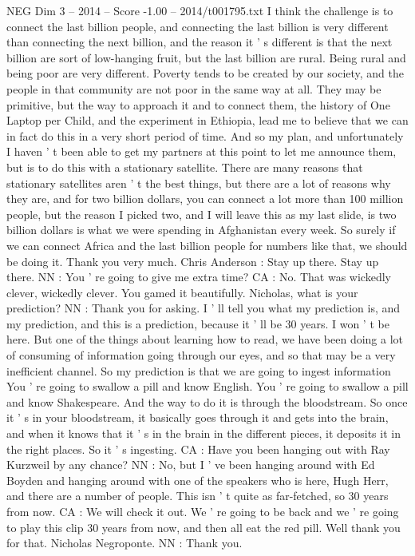 \begin{textsample}{NEG Dim 3 – 2014 – Score -1.00 – 2014/t001795.txt}
I think the challenge is to connect the last billion people, and connecting the last billion is very different than connecting the next billion, and the reason it ' s different is that the next billion are sort of low-hanging fruit, but the last billion are rural.
Being rural and being poor are very different.
Poverty tends to be created by our society, and the people in that community are not poor in the same way at all.
They may be primitive, but the way to approach it and to connect them, the history of One Laptop per Child, and the experiment in Ethiopia, lead me to believe that we can in fact do this in a very short period of time.
And so my plan, and unfortunately I haven ' t been able to get my partners at this point to let me announce them, but is to do this with a stationary satellite.
There are many reasons that stationary satellites aren ' t the best things, but there are a lot of reasons why they are, and for two billion dollars, you can connect a lot more than 100 million people, but the reason I picked two, and I will leave this as my last slide, is two billion dollars is what we were spending in Afghanistan every week.
So surely if we can connect Africa and the last billion people for numbers like that, we should be doing it.
Thank you very much.
Chris Anderson : Stay up there.
Stay up there.
NN : You ' re going to give me extra time?
CA : No.
That was wickedly clever, wickedly clever.
You gamed it beautifully.
Nicholas, what is your prediction?
NN : Thank you for asking.
I ' ll tell you what my prediction is, and my prediction, and this is a prediction, because it ' ll be 30 years.
I won ' t be here.
But one of the things about learning how to read, we have been doing a lot of consuming of information going through our eyes, and so that may be a very inefficient channel.
So my prediction is that we are going to ingest information You ' re going to swallow a pill and know English.
You ' re going to swallow a pill and know Shakespeare.
And the way to do it is through the bloodstream.
So once it ' s in your bloodstream, it basically goes through it and gets into the brain, and when it knows that it ' s in the brain in the different pieces, it deposits it in the right places.
So it ' s ingesting.
CA : Have you been hanging out with Ray Kurzweil by any chance?
NN : No, but I ' ve been hanging around with Ed Boyden and hanging around with one of the speakers who is here, Hugh Herr, and there are a number of people.
This isn ' t quite as far-fetched, so 30 years from now.
CA : We will check it out.
We ' re going to be back and we ' re going to play this clip 30 years from now, and then all eat the red pill.
Well thank you for that.
Nicholas Negroponte.
NN : Thank you.

\end{textsample}
